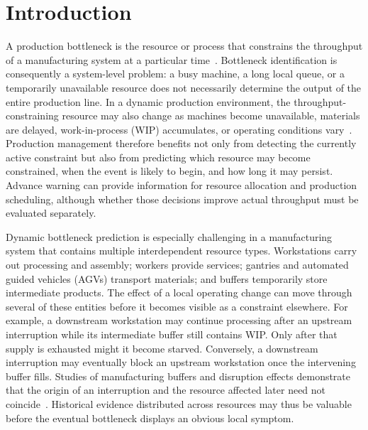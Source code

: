 \chapter{Introduction}\label{ch:introduction}

A production bottleneck is the resource or process that constrains the throughput of a manufacturing system at a particular time~\cite{subramaniyan2023throughput,tang2024comprehensive}. Bottleneck identification is consequently a system-level problem: a busy machine, a long local queue, or a temporarily unavailable resource does not necessarily determine the output of the entire production line. In a dynamic production environment, the throughput-constraining resource may also change as machines become unavailable, materials are delayed, work-in-process (WIP) accumulates, or operating conditions vary~\cite{lai2021data}. Production management therefore benefits not only from detecting the currently active constraint but also from predicting which resource may become constrained, when the event is likely to begin, and how long it may persist. Advance warning can provide information for resource allocation and production scheduling, although whether those decisions improve actual throughput must be evaluated separately.

Dynamic bottleneck prediction is especially challenging in a manufacturing system that contains multiple interdependent resource types. Workstations carry out processing and assembly; workers provide services; gantries and automated guided vehicles (AGVs) transport materials; and buffers temporarily store intermediate products. The effect of a local operating change can move through several of these entities before it becomes visible as a constraint elsewhere. For example, a downstream workstation may continue processing after an upstream interruption while its intermediate buffer still contains WIP. Only after that supply is exhausted might it become starved. Conversely, a downstream interruption may eventually block an upstream workstation once the intervening buffer fills. Studies of manufacturing buffers and disruption effects demonstrate that the origin of an interruption and the resource affected later need not coincide~\cite{gu2015passive,zhang2022vulnerability}. Historical evidence distributed across resources may thus be valuable before the eventual bottleneck displays an obvious local symptom.

